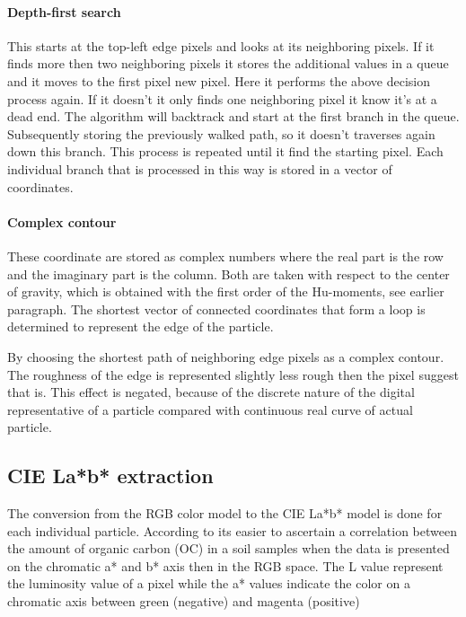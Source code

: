\documentclass[11pt,fleqn,,a4paper,twoside,openright]{book}
\begin{document}
\paragraph{Depth-first search}\label{Depth-first search}
This starts at the top-left edge pixels and looks at its neighboring pixels. If it finds more then two neighboring pixels it stores the additional values in a queue and it moves to the first pixel new pixel. Here it performs the above decision process again. If it doesn't it only finds one neighboring pixel it know it's at a dead end. The algorithm will backtrack and start at the first branch in the queue. Subsequently storing the previously walked path, so it doesn't traverses again down this branch. This process is repeated until it find the starting pixel. Each individual branch that is processed in this way is stored in a vector of coordinates.

\paragraph{Complex contour}\label{Complex contour}
These coordinate are stored as complex numbers where the real part is the row and the imaginary part is the column. Both are taken with respect to the center of gravity, which is obtained with the first order of the Hu-moments, see earlier paragraph.
The shortest vector of connected coordinates that form a loop is determined to represent the edge of the particle. 

\begin{remark}
	By choosing the shortest path of neighboring edge pixels as a complex contour. The roughness of the edge is represented slightly less rough then the pixel suggest that is. This effect is negated, because of the discrete nature of the digital representative of a particle compared with continuous real curve of actual particle.	
\end{remark}

\subsection{CIE La*b* extraction}\label{CIELab}
The conversion from the RGB color model to the CIE La*b* model is done for each individual particle. According to \citeauthor{Spijker14a} \cite{Spijker14a} its easier to ascertain a correlation between the amount of organic carbon (OC) in a soil samples when the data is presented on the chromatic a* and b* axis then in the RGB space. The L value represent the luminosity value of a pixel while the a* values indicate the color on a chromatic axis between green (negative) and magenta (positive)
\end{document}
